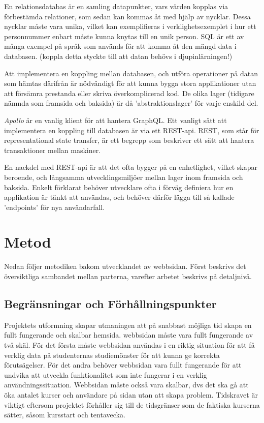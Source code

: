 En relationsdatabas är en samling datapunkter, vars värden kopplas via förbestämda relationer, som sedan kan kommas åt med hjälp av nycklar. Dessa nycklar måste vara unika, vilket kan exemplifieras i verklighetsexemplet i hur ett personnummer enbart måste kunna knytas till en unik person. SQL är ett av många exempel på språk som används för att komma åt den mängd data i databasen.  (koppla detta styckte till att datan behövs i djupinlärningen!)

Att implementera en koppling mellan databasen, och utföra operationer på datan som hämtas därifrån är nödvändigt för att kunna bygga stora applikationer utan att försämra prestanda eller skriva överkomplicerad kod. De olika lager (tidigare nämnda som framsida och baksida) är då 'abstraktionslager' för varje enskild del.

\emph{Apollo} är en vanlig klient för att hantera GraphQL. Ett vanligt sätt att implementera en koppling till databasen är via ett REST-api. REST, som står för representational state transfer, är ett begrepp som beskriver ett sätt att hantera transaktioner mellan maskiner.

En nackdel med REST-api är att det ofta bygger på en enhetlighet, vilket skapar beroende, och långsamma utvecklingsmiljöer mellan lager inom framsida och baksida. Enkelt förklarat behöver utvecklare ofta i förväg definiera hur en applikation är tänkt att användas, och behöver därför lägga till så kallade 'endpoints' för nya användarfall.

\section{Metod}
Nedan följer metodiken bakom utvecklandet av webbsidan. Först beskrivs det översiktliga sambandet mellan parterna, varefter arbetet beskrivs på detaljnivå.

\subsection{Begränsningar och Förhållningspunkter}
Projektets utformning skapar utmaningen att på snabbast möjliga tid skapa en fullt fungerande och skalbar hemsida. webbsidan måste vara fullt fungerande av två skäl. För det första måste webbsidan användas i en riktig situation för att få verklig data på studenternas studiemönster för att kunna ge korrekta förutsägelser. För det andra behöver webbsidan vara fullt fungerande för att undvika att utveckla funktionalitet som inte fungerar i en verklig användningssituation. Webbsidan måste också vara skalbar, dvs det ska gå att öka antalet kurser och användare på sidan utan att skapa problem. Tidskravet är viktigt eftersom projektet förhåller sig till de tidsgränser som de faktiska kurserna sätter, såsom kursstart och tentavecka. 

